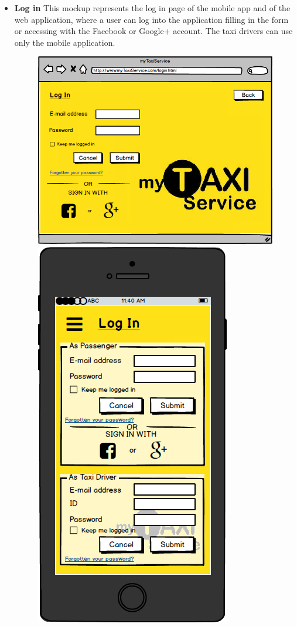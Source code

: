 \documentclass[18pt,oneside,a4paper, titlepage]{article}
\begin{document}
\begin{itemize}
\begin{figure}[h]
				\end{figure}
				\\
				\item \textbf{Log in} This mockup represents the log in page of the mobile app and of the web application, where a user can log into the application filling in the form or accessing with the Facebook or Google+ account. The taxi drivers can use only the mobile application.
				\begin{figure}[h]
					\includegraphics[scale=0.3]{WebAppLogin.png}%
					\qquad\qquad
					\includegraphics[scale=0.3]{MobileAppLogin.png}
					

\end{figure}
\end{itemize}
\end{document}
